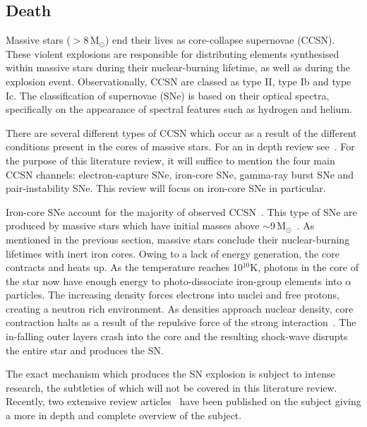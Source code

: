 {%

\subsection{Death} %
\label{sub:death}

Massive stars ($>$8\,M$_{\odot}$) end their lives as core-collapse supernovae (CCSN).
These violent explosions are responsible for distributing elements synthesised within massive stars during their nuclear-burning lifetime, as well as during the explosion event.
Observationally, CCSN are classed as type II, type Ib and type Ic.\footnotemark
{}
The classification of supernovae (SNe) is based on their optical spectra, specifically on the appearance of spectral features such as hydrogen and helium.

There are several different types of CCSN which occur as a result of the different conditions present in the cores of massive stars.
For an in depth review see~\cite{Janka12}.
For the purpose of this literature review, it will suffice to mention the four main CCSN channels: electron-capture SNe, iron-core SNe, gamma-ray burst SNe and pair-instability SNe.
This review will focus on iron-core SNe in particular.

Iron-core SNe account for the majority of observed CCSN~\citep{Smartt09,Janka12,Eldridge13}.
This type of SNe are produced by massive stars which have initial masses above $\sim$9\,M$_{\odot}$~\citep{Poelarends08}.
As mentioned in the previous section, massive stars conclude their nuclear-burning lifetimes with inert iron cores.
Owing to a lack of energy generation, the core contracts and heats up.
As the temperature reaches 10$^{10}$K, photons in the core of the star now have enough energy to photo-dissociate iron-group elements into $\alpha$ particles.
The increasing density forces electrons into nuclei and free protons, creating a neutron rich environment.
As densities approach nuclear density, core contraction halts as a result of the repulsive force of the strong interaction~\citep{Janka12}.
The in-falling outer layers crash into the core and the resulting shock-wave disrupts the entire star and produces the SN.

The exact mechanism which produces the SN explosion is subject to intense research, the subtleties of which will not be covered in this literature review.
Recently, two extensive review articles~\citep{Janka12, Burrows13} have been published on the subject giving a more in depth and complete overview of the subject.

}
